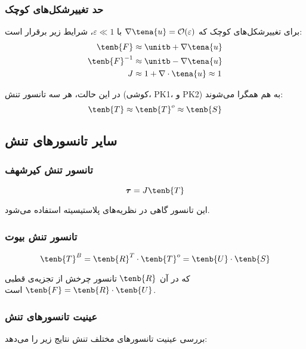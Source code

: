 \subsubsection{حد تغییرشکل‌های کوچک}

برای تغییرشکل‌های کوچک که $\nabla \tena{u} = \mathcal{O}(\varepsilon)$ با $\varepsilon \ll 1$، شرایط زیر برقرار است:
\begin{align}
	\tenb{F}      & \approx \unitb + \nabla \tena{u}            \\
	\tenb{F}^{-1} & \approx \unitb - \nabla \tena{u}            \\
	J             & \approx 1 + \nabla \cdot \tena{u} \approx 1
\end{align}

در این حالت، هر سه تانسور تنش (کوشی، PK1، و PK2) به هم همگرا می‌شوند:
\begin{equation}
	\tenb{T} \approx \tenb{T}^o \approx \tenb{S}
\end{equation}

\subsection{سایر تانسورهای تنش}

\subsubsection{تانسور تنش کیرشهف}
\begin{equation}
	\boldsymbol{\tau} = J \tenb{T}
\end{equation}

این تانسور گاهی در نظریه‌های پلاستیسیته استفاده می‌شود.

\subsubsection{تانسور تنش بیوت}
\begin{equation}
	\tenb{T}^B = \tenb{R}^T \cdot \tenb{T}^o = \tenb{U} \cdot \tenb{S}
\end{equation}

که در آن $\tenb{R}$ تانسور چرخش از تجزیه‌ی قطبی $\tenb{F} = \tenb{R} \cdot \tenb{U}$ است.

\subsubsection{عینیت تانسورهای تنش}

بررسی عینیت تانسورهای مختلف تنش نتایج زیر را می‌دهد:


